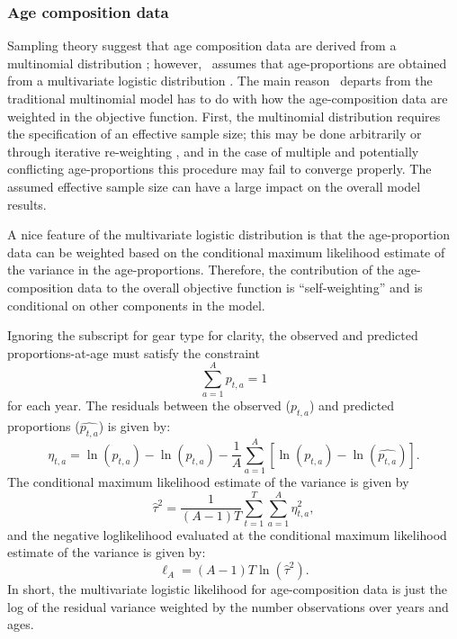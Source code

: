 \begin{multicols}{2}
\subsubsection{Age composition data}
Sampling theory suggest that age composition data are derived from a multinomial distribution \citep{fournier1982general}; however, \iscam\ assumes that age-proportions are obtained from a multivariate logistic distribution \citep{schnute1995influence}.  The main reason \iscam\ departs from the traditional multinomial model has to do with how the age-composition data are weighted in the objective function.  First, the multinomial distribution requires the specification of an effective sample size; this may be done arbitrarily or through iterative re-weighting \citep{MCALLISTER1997,gavaris2002sif}, and in the case of multiple and potentially conflicting age-proportions this procedure may fail to converge properly.  The assumed effective sample size can have a large impact on the overall model results.  

A nice feature of the multivariate logistic distribution is that the age-proportion data can be weighted based on the conditional maximum likelihood estimate of the variance in the age-proportions.  Therefore, the contribution of the age-composition data to the overall objective function is ``self-weighting'' and is conditional on other components in the model.

Ignoring the subscript for gear type for clarity, the observed and predicted proportions-at-age must satisfy the constraint 
\[
 \sum_{a=1}^A p_{t,a} = 1
\]
for each year. The residuals between the observed ($p_{t,a}$) and predicted proportions ($\widehat{p_{t,a}}$) is given by:
\begin{equation}\label{eq7}
\eta_{t,a}=\ln(p_{t,a})-\ln(\widehat{p_{t,a}})-\frac{1}{A}\sum_{a=1}^A\left[\ln(p_{t,a})-\ln(\widehat{p_{t,a}}) \right].
\end{equation}
The conditional maximum likelihood estimate of the variance is given by
\[
\widehat{\tau}^2=\frac{1}{(A-1)T}\sum_{t=1}^T\sum_{a=1}^A \eta_{t,a}^2,
\]
and the negative loglikelihood evaluated at the conditional maximum likelihood estimate of the variance is given by:
\begin{equation}\label{eq8}
	\ell_A = (A-1)T \ln(\widehat{\tau}^2).
\end{equation}
In short, the multivariate logistic likelihood for age-composition data is just the log of the residual variance weighted by the number observations over years and ages.


\end{multicols}
